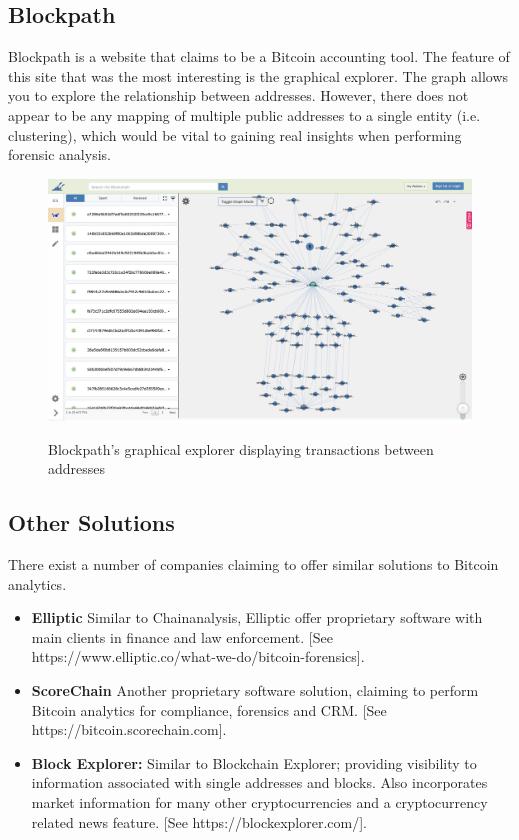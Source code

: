 \subsection{Blockpath} 
Blockpath is a website that claims to be a Bitcoin accounting tool. The feature of this site that was the most interesting is the graphical explorer. The graph allows you to explore the relationship between addresses. However, there does not appear to be any mapping of multiple public addresses to a single entity (i.e. clustering), which would be vital to gaining real insights when performing forensic analysis.  

\begin{figure}
  \centering
  \includegraphics[width = 15cm]{./figures/blockpath}\\[0.5cm] 
  \caption{Blockpath's graphical explorer displaying transactions between addresses \protect \footnotemark}
\end{figure}

\subsection{Other Solutions}

There exist a number of companies claiming to offer similar solutions to Bitcoin analytics. 

\begin{itemize}
    \item \textbf{Elliptic} Similar to Chainanalysis, Elliptic offer proprietary software with main clients in finance and law enforcement. [See https://www.elliptic.co/what-we-do/bitcoin-forensics]. 
    \item \textbf{ScoreChain} Another proprietary software solution, claiming to perform Bitcoin analytics for compliance, forensics and CRM. [See https://bitcoin.scorechain.com]. 
    \item \textbf{Block Explorer:} Similar to Blockchain Explorer; providing visibility to information associated with single addresses and blocks. Also incorporates market information for many other cryptocurrencies and a cryptocurrency related news feature. [See https://blockexplorer.com/]. 

\end{itemize}


